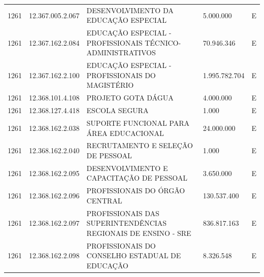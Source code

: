 \documentclass{article}
\begin{document}
\begin{longtable}[c]{m{1cm}|m{2cm}|m{10cm}|m{2cm}|m{1cm}}
\multicolumn{1}{C{1cm}|}{1261} & \multicolumn{1}{C{2cm}|}{12.367.005.2.067} & \multicolumn{1}{L{10cm}|}{DESENVOLVIMENTO DA EDUCAÇÃO ESPECIAL} & \multicolumn{1}{R{2cm}|}{5.000.000} & \multicolumn{1}{C{1cm}}{E} \\
\multicolumn{1}{C{1cm}|}{1261} & \multicolumn{1}{C{2cm}|}{12.367.162.2.084} & \multicolumn{1}{L{10cm}|}{EDUCAÇÃO ESPECIAL - PROFISSIONAIS TÉCNICO-ADMINISTRATIVOS} & \multicolumn{1}{R{2cm}|}{70.946.346} & \multicolumn{1}{C{1cm}}{E} \\
\multicolumn{1}{C{1cm}|}{1261} & \multicolumn{1}{C{2cm}|}{12.367.162.2.100} & \multicolumn{1}{L{10cm}|}{EDUCAÇÃO ESPECIAL - PROFISSIONAIS DO MAGISTÉRIO} & \multicolumn{1}{R{2cm}|}{1.995.782.704} & \multicolumn{1}{C{1cm}}{E} \\
\multicolumn{1}{C{1cm}|}{1261} & \multicolumn{1}{C{2cm}|}{12.368.101.4.108} & \multicolumn{1}{L{10cm}|}{PROJETO GOTA DÁGUA} & \multicolumn{1}{R{2cm}|}{4.000.000} & \multicolumn{1}{C{1cm}}{E} \\
\multicolumn{1}{C{1cm}|}{1261} & \multicolumn{1}{C{2cm}|}{12.368.127.4.418} & \multicolumn{1}{L{10cm}|}{ESCOLA SEGURA} & \multicolumn{1}{R{2cm}|}{1.000} & \multicolumn{1}{C{1cm}}{E} \\
\multicolumn{1}{C{1cm}|}{1261} & \multicolumn{1}{C{2cm}|}{12.368.162.2.038} & \multicolumn{1}{L{10cm}|}{SUPORTE FUNCIONAL PARA ÁREA EDUCACIONAL} & \multicolumn{1}{R{2cm}|}{24.000.000} & \multicolumn{1}{C{1cm}}{E} \\
\multicolumn{1}{C{1cm}|}{1261} & \multicolumn{1}{C{2cm}|}{12.368.162.2.040} & \multicolumn{1}{L{10cm}|}{RECRUTAMENTO E SELEÇÃO DE PESSOAL} & \multicolumn{1}{R{2cm}|}{1.000} & \multicolumn{1}{C{1cm}}{E} \\
\multicolumn{1}{C{1cm}|}{1261} & \multicolumn{1}{C{2cm}|}{12.368.162.2.095} & \multicolumn{1}{L{10cm}|}{DESENVOLVIMENTO E CAPACITAÇÃO DE PESSOAL} & \multicolumn{1}{R{2cm}|}{3.650.000} & \multicolumn{1}{C{1cm}}{E} \\
\multicolumn{1}{C{1cm}|}{1261} & \multicolumn{1}{C{2cm}|}{12.368.162.2.096} & \multicolumn{1}{L{10cm}|}{PROFISSIONAIS DO ÓRGÃO CENTRAL} & \multicolumn{1}{R{2cm}|}{130.537.400} & \multicolumn{1}{C{1cm}}{E} \\
\multicolumn{1}{C{1cm}|}{1261} & \multicolumn{1}{C{2cm}|}{12.368.162.2.097} & \multicolumn{1}{L{10cm}|}{PROFISSIONAIS DAS SUPERINTENDÊNCIAS REGIONAIS DE ENSINO - SRE} & \multicolumn{1}{R{2cm}|}{836.817.163} & \multicolumn{1}{C{1cm}}{E} \\
\multicolumn{1}{C{1cm}|}{1261} & \multicolumn{1}{C{2cm}|}{12.368.162.2.098} & \multicolumn{1}{L{10cm}|}{PROFISSIONAIS DO CONSELHO ESTADUAL DE EDUCAÇÃO} & \multicolumn{1}{R{2cm}|}{8.326.548} & \multicolumn{1}{C{1cm}}{E} \\

\end{longtable}
\end{document}
